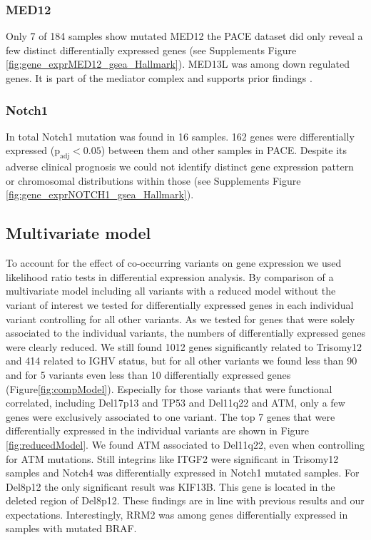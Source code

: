 \FloatBarrier
\clearpage

\subsubsection{MED12}
Only 7 of 184 samples show mutated MED12 the PACE dataset did only reveal a few distinct differentially expressed genes (see Supplements Figure \ref{fig:gene_exprMED12_gsea_Hallmark}). MED13L was among down regulated genes. It is part of the mediator complex and supports prior findings \citep{Kampjarvi2015}.

\FloatBarrier


\subsubsection{Notch1}
In total Notch1 mutation was found in 16 samples. 162 genes were differentially expressed ($\text{p}_\text{adj} < 0.05$) between them and other samples in PACE. Despite its adverse clinical prognosis we could not identify distinct gene expression pattern or chromosomal distributions within those (see Supplements Figure \ref{fig:gene_exprNOTCH1_gsea_Hallmark}).

\subsection{Multivariate model}
To account for the effect of co-occurring variants on gene expression we used likelihood ratio tests in differential expression analysis. By comparison of a multivariate model including all variants with a reduced model without the variant of interest we tested for differentially expressed genes in each individual variant controlling for all other variants. As we tested for genes that were solely associated to the individual variants, the numbers of differentially expressed genes were clearly reduced. We still found 1012 genes significantly related to Trisomy12 and 414 related to IGHV status, but for all other variants we found less than 90 and for 5 variants even less than 10 differentially expressed genes (Figure\ref{fig:compModel}). Especially for those variants that were functional correlated, including Del17p13 and TP53 and Del11q22 and ATM, only a few genes were exclusively associated to one variant. The top 7 genes that were differentially expressed in the individual variants are shown in Figure \ref{fig:reducedModel}. We found ATM associated to Del11q22, even when controlling for ATM mutations. Still integrins like ITGF2 were significant in Trisomy12 samples and Notch4 was differentially expressed in Notch1 mutated samples. For Del8p12 the only significant result was KIF13B. This gene is located in the deleted region of Del8p12. These findings are in line with previous results and our expectations. Interestingly, RRM2 was among genes differentially expressed in samples with mutated BRAF.     

